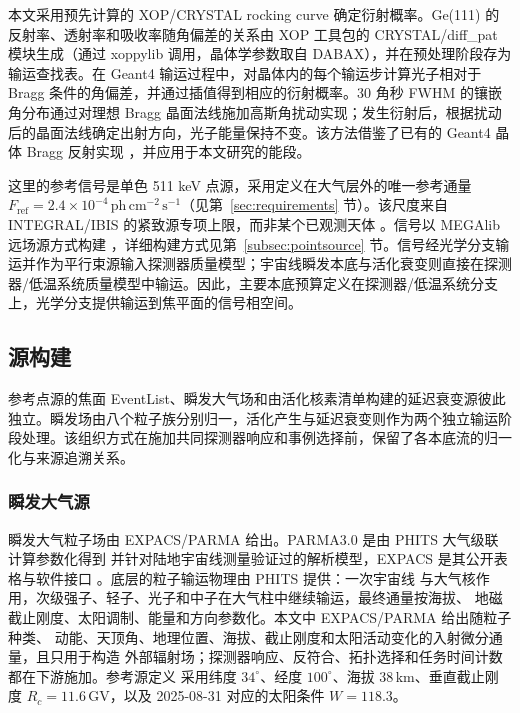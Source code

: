 \documentclass[11pt]{article}
\newcommand{\revblue}[1]{\textcolor{revisionblue}{#1}}
\newcommand{\phcms}{\,\mathrm{ph\,cm^{-2}\,s^{-1}}}
\newcommand{\fref}{F_{\mathrm{ref}}}
\begin{document}
本文采用预先计算的 XOP/CRYSTAL rocking curve 确定衍射概率。Ge(111) 的反射率、透射率和吸收率随角偏差的关系由 XOP 工具包的 CRYSTAL/diff\_pat 模块生成（通过 xoppylib 调用，晶体学参数取自 DABAX）\cite{SanchezDelRio2011XOP}，并在预处理阶段存为输运查找表。在 Geant4 输运过程中，对晶体内的每个输运步计算光子相对于 Bragg 条件的角偏差，并通过插值得到相应的衍射概率。30 角秒 FWHM 的镶嵌角分布通过对理想 Bragg 晶面法线施加高斯角扰动实现；发生衍射后，根据扰动后的晶面法线确定出射方向，光子能量保持不变。该方法借鉴了已有的 Geant4 晶体 Bragg 反射实现 \cite{Guan2023BraggReflection,Reiazi2025G4BraggReflection}，并应用于本文研究的能段。

这里的参考信号是单色 511 keV 点源，采用定义在大气层外的唯一参考通量 $\fref=2.4\times10^{-4}\phcms$（见第~\ref{sec:requirements} 节）。该尺度来自 INTEGRAL/IBIS 的紧致源专项上限，而非某个已观测天体 \cite{DeCesare2011}。信号以 MEGAlib 远场源方式构建 \cite{Zoglauer2006}，详细构建方式见第~\ref{subsec:pointsource} 节。信号经光学分支输运并作为平行束源输入探测器质量模型；宇宙线瞬发本底与活化衰变则直接在探测器/低温系统质量模型中输运。因此，主要本底预算定义在探测器/低温系统分支上，光学分支提供输运到焦平面的信号相空间。

\subsection{源构建}
\label{sec:background}

参考点源的焦面 EventList、瞬发大气场和由活化核素清单构建的延迟衰变源彼此独立。\revblue{瞬发场由八个粒子族分别归一}，活化产生与延迟衰变则作为两个独立输运阶段处理。该组织方式在施加共同探测器响应和事例选择前，保留了各本底流的归一化与来源追溯关系。

\subsubsection{瞬发大气源}
\label{subsec:prompt_source}

瞬发大气粒子场由 EXPACS/PARMA 给出。PARMA3.0 是由 PHITS 大气级联计算参数化得到
并针对陆地宇宙线测量验证过的解析模型，EXPACS 是其公开表格与软件接口
\cite{Sato2015EXPACS,Sato2016PARMA4}。底层的粒子输运物理由 PHITS 提供：一次宇宙线
与大气核作用，次级强子、轻子、光子和中子在大气柱中继续输运，最终通量按海拔、
地磁截止刚度、太阳调制、能量和方向参数化。本文中 EXPACS/PARMA 给出随粒子种类、
动能、天顶角、地理位置、海拔、截止刚度和太阳活动变化的入射微分通量，且只用于构造
外部辐射场；探测器响应、反符合、拓扑选择和任务时间计数都在下游施加。参考源定义
采用纬度 $34^\circ$、经度 $100^\circ$、海拔 $38\,\mathrm{km}$、垂直截止刚度
$R_c=11.6\,\mathrm{GV}$，以及 2025-08-31 对应的太阳条件 $W=118.3$。
\end{document}
